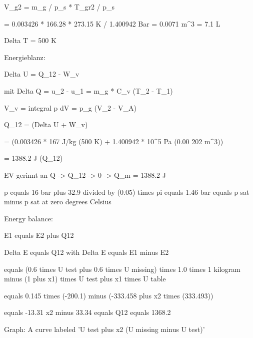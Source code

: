V_g2 = m_g / p_s * T_gr2 / p_s

= 0.003426 * 166.28 * 273.15 K / 1.400942 Bar = 0.0071 m^3 = 7.1 L

Delta T = 500 K

Energieblanz:

Delta U = Q_12 - W_v

mit Delta Q = u_2 - u_1 = m_g * C_v (T_2 - T_1)

V_v = integral p dV = p_g (V_2 - V_A)

Q_12 = (Delta U + W_v)

= (0.003426 * 167 J/kg (500 K) + 1.400942 * 10^5 Pa (0.00 202 m^3))

= 1388.2 J (Q_12)

EV gerinnt an Q -> Q_12 -> 0 -> Q_m = 1388.2 J

p equals 16 bar plus 32.9 divided by (0.05) times pi equals 1.46 bar equals p sat minus p sat at zero degrees Celsius

Energy balance:

E1 equals E2 plus Q12

Delta E equals Q12 with Delta E equals E1 minus E2

equals (0.6 times U test plus 0.6 times U missing) times 1.0 times 1 kilogram minus (1 plus x1) times U test plus x1 times U table

equals 0.145 times (-200.1) minus (-333.458 plus x2 times (333.493))

equals -13.31 x2 minus 33.34 equals Q12 equals 1368.2

Graph: A curve labeled 'U test plus x2 (U missing minus U test)'